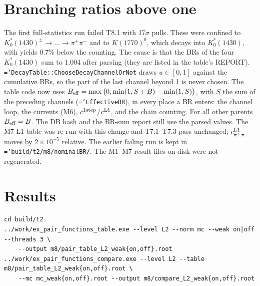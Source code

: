 \documentclass[11pt,a4paper]{article}
\newcommand{\code}[1]{\texttt{\hyphenchar\font=`\-#1}}
\begin{document}
\section{Branching ratios above one}\label{sec:br}
The first full-statistics run failed T8.1 with 17$\sigma$ pulls. These were confined to
$K^*_0(1430)^\pm\to\ldots\to\pi^+\pi^-$ and to $K(1770)^0$, which decays into $K^*_0(1430)$, with yields
0.7\% below the counting. The cause is that the BRs of the four $K^*_0(1430)$ sum to 1.004 after
parsing (they are listed in the table's REPORT). \code{DecayTable::ChooseDecayChannelOrNot} draws
$u\in[0,1]$ against the cumulative BRs, so the part of the last channel beyond 1 is never chosen. The
table code now uses $B_{\rm eff}=\max\big(0,\min(1,S+B)-\min(1,S)\big)$, with $S$ the sum of the
preceding channels (\code{EffectiveBR}), in every place a BR enters: the channel loop, the currents
(M6), $c^{\rm 1step}$/$c^{\rm L1}$, and the chain counting. For all other parents
$B_{\rm eff}=B$. The DB hash and the BR-sum report still use the parsed values. The M7 L1 table was
re-run with this change and T7.1--T7.3 pass unchanged; $c^{\rm L1}_{\pi^+\pi^-}$ moves by
$2\times10^{-5}$ relative. The earlier failing run is kept in \code{build/t2/m8/nominalBR/}.
The M1--M7 result files on disk were not regenerated.

\section{Results}
\begin{verbatim}
cd build/t2
../work/ex_pair_functions_table.exe --level L2 --norm mc --weak on|off --threads 3 \
    --output m8/pair_table_L2_weak{on,off}.root
../work/ex_pair_functions_compare.exe --level L2 --table m8/pair_table_L2_weak{on,off}.root \
    --mc mc_weak{on,off}.root --output m8/compare_L2_weak{on,off}.root
\end{verbatim}
\end{document}
